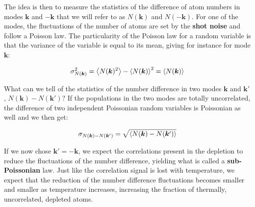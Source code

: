 

 The idea is then to measure the statistics of the difference of atom numbers in modes $\bm{k}$ and $-\bm{k}$ that we will refer to as $N(\bm{k})$ and $N(-\bm{k})$. For one of the modes, the fluctuations of the number of atoms are set by the \textbf{shot noise} and follow a Poisson law. The particularity of the Poisson law for a random variable is that the variance of the variable is equal to its mean, giving for instance for mode $\bm{k}$:

\begin{equation}
    \sigma_{N(\bm{k})}^2 =\left\langle N(\bm{k})^2\right\rangle-\left\langle N(\bm{k})\right\rangle^2 = \left\langle N(\bm{k})\right\rangle
\end{equation}

What can we tell of the statistics of the number difference in two modes $\bm{k}$ and $\bm{k}'$, $N(\bm{k}) - N(\bm{k}')$? If the populations in the two modes are totally uncorrelated, the difference of two independent Poissonian random variables is Poissonian as well and we then get:

\begin{equation}
    \sigma_{N(\bm{k})-N(\bm{k}')} = \sqrt{\left\langle N(\bm{k})-N(\bm{k}')\right\rangle}
\end{equation}

If we now chose $\bm{k}'=-\bm{k}$, we expect the \kmk correlations present in the depletion to reduce the fluctuations of the number difference, yielding what is called a \textbf{sub-Poissonian} law. Just like the \kmk correlation signal is lost with temperature, we expect that the reduction of the number difference fluctuations becomes smaller and smaller as temperature increases, increasing the fraction of thermally, uncorrelated, depleted atoms. 

